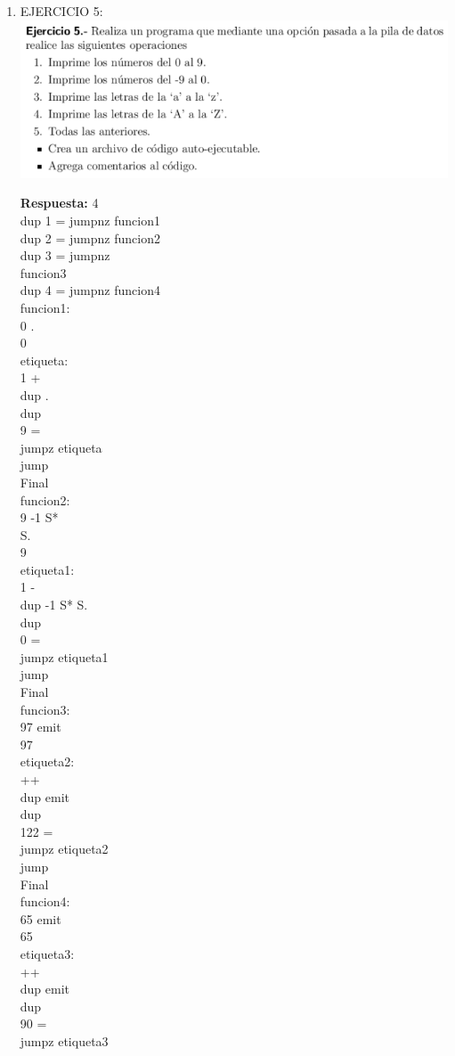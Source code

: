 \documentclass[conference]{IEEEtran}
\begin{document}
\begin{enumerate}
\item  EJERCICIO 5:\\
	\includegraphics{e5}\\
	\begin{center}
	\textbf{Respuesta: } 4 \\ dup 1 = jumpnz funcion1 \\ dup 2 = jumpnz funcion2 \\ dup 3 = jumpnz \\ funcion3 \\ dup 4 = jumpnz funcion4 \\ funcion1: \\ 0 . \\ 0 \\ etiqueta: \\ 1 + \\ dup . \\ dup \\ 9 = \\ jumpz etiqueta \\ jump \\ Final \\ funcion2: \\ 9 -1 S* \\ S. \\ 9 \\ etiqueta1: \\ 1 - \\ dup -1 S* S. \\ dup \\ 0 = \\ jumpz etiqueta1 \\ jump \\ Final \\ funcion3: \\ 97 emit \\ 97 \\ etiqueta2: \\ ++ \\ dup emit \\ dup \\ 122 = \\ jumpz etiqueta2 \\ jump \\ Final \\ funcion4: \\ 65 emit \\ 65 \\ etiqueta3: \\ ++ \\ dup emit \\ dup \\ 90 = \\ jumpz etiqueta3 \\
	\end{center}


\end{enumerate}
\end{document}
